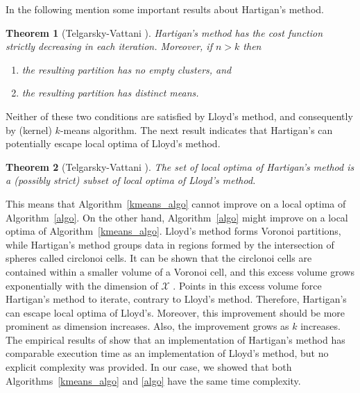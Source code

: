 \documentclass[aps,preprint,nofootinbib,floatfix]{revtex4-1}
\newtheorem{theorem}{Theorem}
\begin{document}
In the following mention some important results about Hartigan's method.

\begin{theorem}[Telgarsky-Vattani \cite{Telgarsky}]
Hartigan's method has the cost function strictly decreasing in each
iteration. Moreover, if $n > k$ then 
\begin{enumerate}
\item \label{noempty} the resulting partition has no empty clusters, and
\item \label{diffmean} the resulting partition has distinct means.
\end{enumerate}
\end{theorem}

Neither of these two conditions are satisfied  by Lloyd's method,
and consequently by (kernel) $k$-means algorithm.
The next result indicates that Hartigan's can potentially 
escape local optima of Lloyd's method.

\begin{theorem}[Telgarsky-Vattani \cite{Telgarsky}]
The set of local optima of Hartigan's method is a (possibly strict) subset
of local optima of Lloyd's method.
\end{theorem}

This means that Algorithm~\ref{kmeans_algo} cannot
improve on a local optima of Algorithm~\ref{algo}. On the other hand,
Algorithm~\ref{algo} might improve on a local optima of 
Algorithm~\ref{kmeans_algo}. Lloyd's method forms Voronoi partitions,
while Hartigan's method groups data
in regions formed by the intersection of spheres called circlonoi cells.
It can be shown that the circlonoi cells are contained within
a smaller volume of a Voronoi cell, and this excess volume grows
exponentially with the dimension of $\mathcal{X}$ 
\cite[Theorems 2.4 and 3.1]{Telgarsky}. 
Points in this excess volume
force Hartigan's method to iterate, contrary
to Lloyd's method. Therefore, Hartigan's 
can escape local
optima of Lloyd's. 
Moreover, this improvement should be more prominent as
dimension increases. Also, the improvement grows as $k$
increases.
The empirical results of \cite{Telgarsky} show that 
an implementation of Hartigan's method has comparable execution time 
as an implementation of
Lloyd's method,
but no explicit complexity was provided. In our case, we showed that both
Algorithms~\ref{kmeans_algo} and \ref{algo} have the same time complexity.
\end{document}
